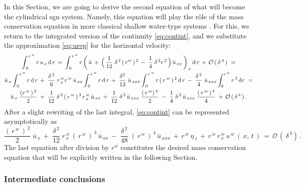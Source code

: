 \documentclass[alpha-refs, 12pt]{wiley-article}
\renewcommand{\O}{\mathcal{O}}
\begin{document}
In this Section, we are going to derive the second equation of what will become the cylindrical \acrshort{sgn} system. Namely, this equation will play the r\^ole of the mass conservation equation in more classical shallow water-type systems \citep{Dutykh2013, Dutykh2011b, Dutykh2014c, Dutykh2014f, Clamond2019}. For this, we return to the integrated version of the continuity \cref{eq:contint}, and we substitute the approximation \eqref{eq:urep} for the horizontal velocity:
\begin{multline*}
  \int_{\,0}^{\,r^{\,w}}r\,u_{\,x}\,\mathrm{d}\,r\,=\, \int_{\,0}^{\,r^{\,w}}r\,\biggl(\,\bar{u}\,+\,\Bigl(\,\frac{1}{12}\;\delta^{\,2}\,(\,r^{w}\,)^{\,2}\,-\;\frac{1}{4}\;\delta^{\,2}r^{\,2}\,\Bigr)\,\bar{u}_{\,xx}\,\biggr)_{\,x}\,\mathrm{d}\,r\,+\,\O\,(\,\delta^{\,4}\,)\ =\\
  \bar{u}_{\,x}\int_{\,0}^{\,r^{\,w}}r\,\mathrm{d}\,r\,+\; \frac{\delta^{\,2}}{6}\;r^{\,w}_{\,x}r^{\,w}\,\bar{u}_{\,xx} \int_{\,0}^{\,r^{\,w}}r\,\mathrm{d}\,r\,+\;\frac{\delta^{2}}{12}\;\bar{u}_{\,xxx}\int_{\,0}^{\,r^{\,w}}r\,(\,r^{\,w}\,)^{\,2}\,\mathrm{d}\,r\,-\;\frac{\delta^{\,2}}{4}\;\bar{u}_{\,xxx} \int_{0}^{r^{\,w}}r^{\,3}\,\mathrm{d}r\ =\\
  \bar{u}_{\,x}\;\frac{(r^{\,w}\,)^{\,2}}{2}\;+\;\frac{1}{12}\;\delta^{\,2}\,(\,r^{\,w}\,)^{\,3}\,r^{\,w}_{\,x}\,\bar{u}_{\,xx}\,+\;\frac{1}{12}\;\delta^{\,2}\,\bar{u}_{\,xxx}\;\frac{(\,r^{\,w})^{\,4}}{2}\;-\;\frac{1}{4}\;\delta^{\,2}\,\bar{u}_{\,xxx}\;\frac{(\,r^{\,w}\,)^{\,4}}{4}\; +\,\O\,(\,\delta^{\,4}\,)\,.
\end{multline*}
After a slight rewriting of the last integral, \cref{eq:contint} can be represented asymptotically as
\begin{equation*}
  \frac{(\,r^{\,w}\,)^{\,2}}{2}\;\bar{u}_{\,x}\,+\;\frac{\delta^{\,2}}{12}\;r^{\,w}_{\,x}\,(\,r^{\,w}\,)^{\,3}\,\bar{u}_{\,xx}\,-\;\frac{\delta^{\,2}}{48}\;(\,r^{\,w}\,)^{\,4}\,\bar{u}_{\,xxx}\,+\,r^{\,w}\,\eta_{\;t}\,+\,r^{\,w}\,r^{\,w}_{\,x}\,u^{\,w}\,(\,x,\,t\,)\, = \, \O\,(\,\delta^{\,4})\,.
\end{equation*}
The last equation after division by $r^w$ constitutes the desired mass conservation equation that will be explicitly written in the following Section.

\subsubsection{Intermediate conclusions}
\end{document}
